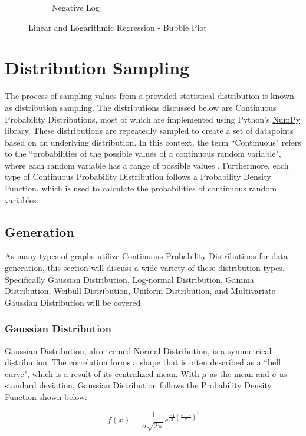 \begin{figure}
\begin{subfigure}[b]{0.21\textwidth}
         \caption{Negative Log}
         \label{figure: neg_log}
     \end{subfigure}
        \caption{Linear and Logarithmic Regression - Bubble Plot}
        \label{figure:bubbleplot_regression}
\end{figure}

\section{Distribution Sampling}

The process of sampling values from a provided statistical distribution is known as distribution sampling. The distributions discussed below are Continuous Probability Distributions, most of which are implemented using Python's \href{https://numpy.org/}{NumPy} library. These distributions are repeatedly sampled to create a set of datapoints based on an underlying distribution. In this context, the term ``Continuous" refers to the ``probabilities of the possible values of a continuous random variable", where each random variable has a range of possible values \cite{minitab_express}. Furthermore, each type of Continuous Probability Distribution follows a Probability Density Function, which is used to calculate the probabilities of continuous random variables. 

\subsection{Generation}
As many types of graphs utilize Continuous Probability Distributions for data generation, this section will discuss a wide variety of these distribution types. Specifically Gaussian Distribution, Log-normal Distribution, Gamma Distribution, Weibull Distribution, Uniform Distribution, and Multivariate Gaussian Distribution will be covered.

\subsubsection{Gaussian Distribution}
\label{subsubsection:normal_distribution}
Gaussian Distribution, also termed Normal Distribution, is a symmetrical distribution. The correlation forms a shape that is often described as a ``bell curve", which is a result of its centralized mean. With \(\mu\) as the mean and \(\sigma\) as standard deviation, Gaussian Distribution follows the Probability Density Function shown below:

\begin{displaymath}
f(x) = \frac{1}{\sigma\sqrt{2\pi}}e^{\frac{-1}{2}(\frac{x-\mu}{\sigma})^2}
\end{displaymath}

